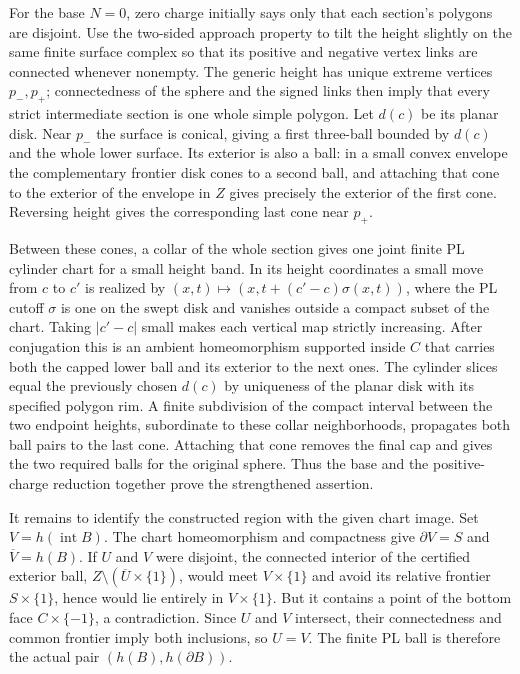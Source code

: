 For the base $N=0$, zero charge initially says only that each section's
polygons are disjoint. Use the two-sided approach property to tilt the
height slightly on the same finite surface complex so that its positive
and negative vertex links are connected whenever nonempty. The generic
height has unique extreme vertices $p_-,p_+$; connectedness of the sphere
and the signed links then imply that every strict intermediate section
is one whole simple polygon. Let $d(c)$ be its planar disk. Near $p_-$ the
surface is conical, giving a first three-ball bounded by $d(c)$ and the
whole lower surface. Its exterior is also a ball: in a small convex
envelope the complementary frontier disk cones to a second ball, and
attaching that cone to the exterior of the envelope in $Z$ gives precisely
the exterior of the first cone. Reversing height gives the corresponding
last cone near $p_+$.

Between these cones, a collar of the whole section gives one joint finite
PL cylinder chart for a small height band. In its height coordinates a
small move from $c$ to $c'$ is realized by
$(x,t)\mapsto(x,t+(c'-c)\sigma(x,t))$, where the PL cutoff $\sigma$ is one
on the swept disk and vanishes outside a compact subset of the chart.
Taking $|c'-c|$ small makes each vertical map strictly increasing. After
conjugation this is an ambient homeomorphism supported inside $C$ that
carries both the capped lower ball and its exterior to the next ones.
The cylinder slices equal the previously chosen $d(c)$ by uniqueness of
the planar disk with its specified polygon rim. A finite subdivision of
the compact interval between the two endpoint heights, subordinate to
these collar neighborhoods, propagates both ball pairs to the last cone.
Attaching that cone removes the final cap and gives the two required
balls for the original sphere. Thus the base and the positive-charge
reduction together prove the strengthened assertion.

It remains to identify the constructed region with the given chart image.
Set $V=h(\operatorname{int}B)$. The chart homeomorphism and compactness give
$\partial V=S$ and $\overline V=h(B)$. If $U$ and $V$ were disjoint, the
connected interior of the certified exterior ball,
$Z\setminus(\overline U\times\{1\})$, would meet $V\times\{1\}$ and
avoid its relative frontier $S\times\{1\}$, hence would lie entirely in
$V\times\{1\}$. But it contains a point of the bottom face
$C\times\{-1\}$, a contradiction. Since $U$ and $V$ intersect, their
connectedness and common frontier imply both inclusions, so $U=V$.
The finite PL ball is therefore the actual pair $(h(B),h(\partial B))$.

